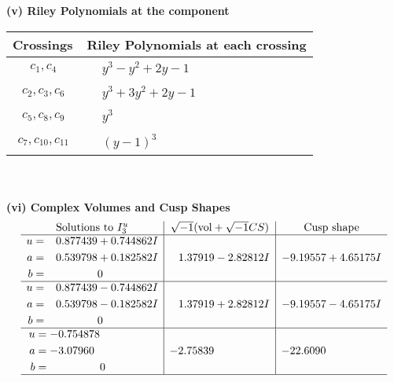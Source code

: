\documentclass[1p]{elsarticle_modified}
\theoremstyle{definition}
\newcommand{\I}{\sqrt{-1}}
\begin{document}
\newpage\renewcommand{\arraystretch}{1}
\flushleft \textbf{(v) Riley Polynomials at the component}\newline \\
\begin{tabular}{m{50pt}|m{274pt}}
Crossings & \hspace{64pt}Riley Polynomials at each crossing \\
\hline $$\begin{aligned}c_{1},c_{4}\end{aligned}$$&$\begin{aligned}
&y^3- y^2+2 y-1
\end{aligned}$\\
\hline $$\begin{aligned}c_{2},c_{3},c_{6}\end{aligned}$$&$\begin{aligned}
&y^3+3 y^2+2 y-1
\end{aligned}$\\
\hline $$\begin{aligned}c_{5},c_{8},c_{9}\end{aligned}$$&$\begin{aligned}
&y^3
\end{aligned}$\\
\hline $$\begin{aligned}c_{7},c_{10},c_{11}\end{aligned}$$&$\begin{aligned}
&(y-1)^3
\end{aligned}$\\
\hline
\end{tabular}\\~\\
\newpage\flushleft \textbf{(vi) Complex Volumes and Cusp Shapes}
$$\begin{array}{c|c|c}  
\text{Solutions to }I^u_{3}& \I (\text{vol} + \sqrt{-1}CS) & \text{Cusp shape}\\
 \hline 
\begin{aligned}
u &= \phantom{-}0.877439 + 0.744862 I \\
a &= \phantom{-}0.539798 + 0.182582 I \\
b &= \phantom{-0.000000 } 0\end{aligned}
 & \phantom{-}1.37919 - 2.82812 I & -9.19557 + 4.65175 I \\ \hline\begin{aligned}
u &= \phantom{-}0.877439 - 0.744862 I \\
a &= \phantom{-}0.539798 - 0.182582 I \\
b &= \phantom{-0.000000 } 0\end{aligned}
 & \phantom{-}1.37919 + 2.82812 I & -9.19557 - 4.65175 I \\ \hline\begin{aligned}
u &= -0.754878\phantom{ +0.000000I} \\
a &= -3.07960\phantom{ +0.000000I} \\
b &= \phantom{-0.000000 } 0\end{aligned}
 & -2.75839\phantom{ +0.000000I} & -22.6090\phantom{ +0.000000I}\\
 \hline 
 \end{array}$$\newpage
\end{document}
